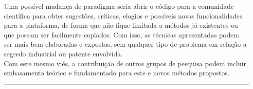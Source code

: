\begin{enumerate}
\begin{enumerate}[label*=\arabic*.]
Uma possível mudança de paradigma seria abrir o código para a comunidade científica para obter sugestões, críticas, elogios e possíveis novas funcionalidades para a plataforma, de forma que não fique limitada a métodos já existentes ou que possam ser facilmente copiados. Com isso, as técnicas apresentadas podem ser mais bem elaboradas e expostas, sem qualquer tipo de problema em relação a segredo industrial ou patente envolvida.
\\[6pt]
Com este mesmo viés, a contribuição de outros grupos de pesquisa podem incluir embasamento teórico e fundamentado para este e novos métodos propostos.
    \end{enumerate}
\end{enumerate}
\noindent\rule{14.5cm}{0.4pt}